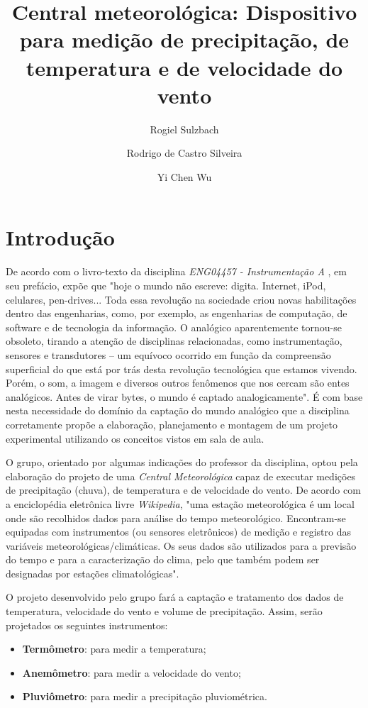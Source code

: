 \documentclass[12pt,a4paper]{instrumentacao}
\title{Central meteorológica: Dispositivo para medição de precipitação, de temperatura e de velocidade do vento}
\author{Rogiel Sulzbach \and Rodrigo de Castro Silveira \and Yi Chen Wu}
\institute{Universidade Federal do Rio Grande do Sul, Departamento de Engenharia Elétrica, Curso de Engenharia Elétrica, Instrumentação A, Prof. Dr. Alexandre Balbinot}
\begin{document}
\maketitle

\chapter{Introdução}
De acordo com o livro-texto da disciplina \textit{ENG04457 - Instrumentação A} \cite{livro-texto}, em seu prefácio, expõe que "hoje o mundo não escreve: digita. Internet, iPod, celulares, pen-drives... Toda essa revolução na sociedade criou novas habilitações dentro das engenharias, como, por exemplo, as engenharias de computação, de software e de tecnologia da informação. O analógico aparentemente tornou-se obsoleto, tirando a atenção de disciplinas relacionadas, como instrumentação, sensores e transdutores -- um equívoco ocorrido em função da compreensão superficial do que está por trás desta revolução tecnológica que estamos vivendo. Porém, o som, a imagem e diversos outros fenômenos que nos cercam são entes analógicos. Antes de virar bytes, o mundo é captado analogicamente". É com base nesta necessidade do domínio da captação do mundo analógico que a disciplina corretamente propõe a elaboração, planejamento e montagem de um projeto experimental utilizando os conceitos vistos em sala de aula.

O grupo, orientado por algumas indicações do professor da disciplina, optou pela elaboração do projeto de uma \textit{Central Meteorológica} capaz de executar medições de precipitação (chuva), de temperatura e de velocidade do vento. De acordo com a enciclopédia eletrônica livre \textit{Wikipedia}\cite{estacao}, "uma estação meteorológica é um local onde são recolhidos dados para análise do tempo meteorológico. Encontram-se equipadas com instrumentos (ou sensores eletrônicos) de medição e registro das variáveis meteorológicas/climáticas. Os seus dados são utilizados para a previsão do tempo e para a caracterização do clima, pelo que também podem ser designadas por estações climatológicas".

O projeto desenvolvido pelo grupo fará a captação e tratamento dos dados de temperatura, velocidade do vento e volume de precipitação. Assim, serão projetados os seguintes instrumentos:

\begin{itemize}
	\item \textbf{Termômetro}: para medir a temperatura;
	\item \textbf{Anemômetro}: para medir a velocidade do vento;
	\item \textbf{Pluviômetro}: para medir a precipitação pluviométrica.
\end{itemize}
\end{document}
